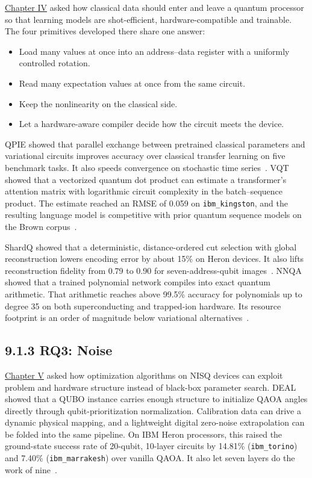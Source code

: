 \documentclass{report}
\theoremstyle{plain}
\theoremstyle{definition}
\theoremstyle{remark}
\begin{document}
\hyperref[ch:qml]{Chapter IV} asked how classical data should enter and leave a quantum processor so that learning models are shot-efficient, hardware-compatible and trainable. The four primitives developed there share one answer:
\begin{itemize}
  \item Load many values at once into an address--data register with a uniformly controlled rotation.
  \item Read many expectation values at once from the same circuit.
  \item Keep the nonlinearity on the classical side.
  \item Let a hardware-aware compiler decide how the circuit meets the device.
\end{itemize}

QPIE showed that parallel exchange between pretrained classical parameters and variational circuits improves accuracy over classical transfer learning on five benchmark tasks. It also speeds convergence on stochastic time series~\cite{guo2025qpie}. VQT showed that a vectorized quantum dot product can estimate a transformer's attention matrix with logarithmic circuit complexity in the batch--sequence product. The estimate reached an RMSE of 0.059 on \texttt{ibm\_kingston}, and the resulting language model is competitive with prior quantum sequence models on the Brown corpus~\cite{guo2025vqt}.

ShardQ showed that a deterministic, distance-ordered cut selection with global reconstruction lowers encoding error by about 15\% on Heron devices. It also lifts reconstruction fidelity from 0.79 to 0.90 for seven-address-qubit images~\cite{guo2025shardq}. NNQA showed that a trained polynomial network compiles into exact quantum arithmetic. That arithmetic reaches above 99.5\% accuracy for polynomials up to degree 35 on both superconducting and trapped-ion hardware. Its resource footprint is an order of magnitude below variational alternatives~\cite{guo2026nnqa}.

\subsection{9.1.3 RQ3: Noise}\label{sec:conclusion:rq3}

\hyperref[ch:nisq]{Chapter V} asked how optimization algorithms on NISQ devices can exploit problem and hardware structure instead of black-box parameter search. DEAL showed that a QUBO instance carries enough structure to initialize QAOA angles directly through qubit-prioritization normalization. Calibration data can drive a dynamic physical mapping, and a lightweight digital zero-noise extrapolation can be folded into the same pipeline. On IBM Heron processors, this raised the ground-state success rate of 20-qubit, 10-layer circuits by 14.81\% (\texttt{ibm\_torino}) and 7.40\% (\texttt{ibm\_marrakesh}) over vanilla QAOA. It also let seven layers do the work of nine~\cite{guo2025deal}.
\end{document}
